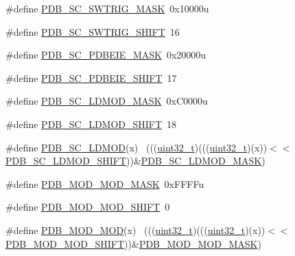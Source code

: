\begin{DoxyCompactItemize}
\item 
\#define \hyperlink{group___p_d_b___register___masks_gaee37e4f669c308f1bfa17462ccbdc44b}{P\+D\+B\+\_\+\+S\+C\+\_\+\+S\+W\+T\+R\+I\+G\+\_\+\+M\+A\+SK}~0x10000u
\item 
\#define \hyperlink{group___p_d_b___register___masks_ga494cf2eed3e90d588c9d6a79cdb5aaaa}{P\+D\+B\+\_\+\+S\+C\+\_\+\+S\+W\+T\+R\+I\+G\+\_\+\+S\+H\+I\+FT}~16
\item 
\#define \hyperlink{group___p_d_b___register___masks_gadad9b8b56988b977ed415ab18985f9dc}{P\+D\+B\+\_\+\+S\+C\+\_\+\+P\+D\+B\+E\+I\+E\+\_\+\+M\+A\+SK}~0x20000u
\item 
\#define \hyperlink{group___p_d_b___register___masks_gaa64d610e568a9cafe7d2110a76daf8df}{P\+D\+B\+\_\+\+S\+C\+\_\+\+P\+D\+B\+E\+I\+E\+\_\+\+S\+H\+I\+FT}~17
\item 
\#define \hyperlink{group___p_d_b___register___masks_ga78d77e651e5cc9a5ddeb63fa6ac627af}{P\+D\+B\+\_\+\+S\+C\+\_\+\+L\+D\+M\+O\+D\+\_\+\+M\+A\+SK}~0x\+C0000u
\item 
\#define \hyperlink{group___p_d_b___register___masks_ga53a8856bc6371ac178123477526e8249}{P\+D\+B\+\_\+\+S\+C\+\_\+\+L\+D\+M\+O\+D\+\_\+\+S\+H\+I\+FT}~18
\item 
\#define \hyperlink{group___p_d_b___register___masks_ga53f46e26b4a7cc5b74fa449687227baf}{P\+D\+B\+\_\+\+S\+C\+\_\+\+L\+D\+M\+OD}(x)                                                ~(((\hyperlink{_p_e___types_8h_a33594304e786b158f3fb30289278f5af}{uint32\+\_\+t})(((\hyperlink{_p_e___types_8h_a33594304e786b158f3fb30289278f5af}{uint32\+\_\+t})(x))$<$$<$\hyperlink{group___p_d_b___register___masks_ga53a8856bc6371ac178123477526e8249}{P\+D\+B\+\_\+\+S\+C\+\_\+\+L\+D\+M\+O\+D\+\_\+\+S\+H\+I\+FT}))\&\hyperlink{group___p_d_b___register___masks_ga78d77e651e5cc9a5ddeb63fa6ac627af}{P\+D\+B\+\_\+\+S\+C\+\_\+\+L\+D\+M\+O\+D\+\_\+\+M\+A\+SK})
\item 
\#define \hyperlink{group___p_d_b___register___masks_ga9dddc13b37ba4e27c8401dfa56b2173f}{P\+D\+B\+\_\+\+M\+O\+D\+\_\+\+M\+O\+D\+\_\+\+M\+A\+SK}~0x\+F\+F\+F\+Fu
\item 
\#define \hyperlink{group___p_d_b___register___masks_gaf224ebff31aea3bd5318f078eccf060e}{P\+D\+B\+\_\+\+M\+O\+D\+\_\+\+M\+O\+D\+\_\+\+S\+H\+I\+FT}~0
\item 
\#define \hyperlink{group___p_d_b___register___masks_ga8c8f8dd2b40994da70b3ed8edec15bb0}{P\+D\+B\+\_\+\+M\+O\+D\+\_\+\+M\+OD}(x)                                                  ~(((\hyperlink{_p_e___types_8h_a33594304e786b158f3fb30289278f5af}{uint32\+\_\+t})(((\hyperlink{_p_e___types_8h_a33594304e786b158f3fb30289278f5af}{uint32\+\_\+t})(x))$<$$<$\hyperlink{group___p_d_b___register___masks_gaf224ebff31aea3bd5318f078eccf060e}{P\+D\+B\+\_\+\+M\+O\+D\+\_\+\+M\+O\+D\+\_\+\+S\+H\+I\+FT}))\&\hyperlink{group___p_d_b___register___masks_ga9dddc13b37ba4e27c8401dfa56b2173f}{P\+D\+B\+\_\+\+M\+O\+D\+\_\+\+M\+O\+D\+\_\+\+M\+A\+SK})

\end{DoxyCompactItemize}
